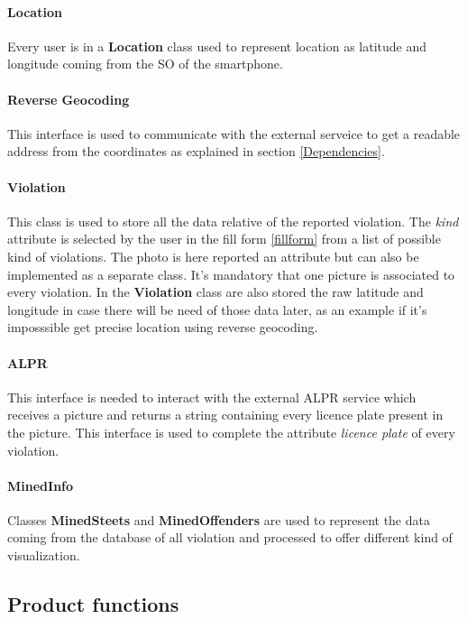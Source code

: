 \paragraph{Location}
Every user is in a \textbf{Location} class used to represent location as latitude and longitude coming from the SO of the smartphone.
\paragraph{Reverse Geocoding}
This interface is used to communicate with the external serveice to get a readable address from the coordinates as explained in section \ref{Dependencies}.
\paragraph{Violation}
This class is used to store all the data relative of the reported violation. The \textit{kind} attribute is selected by the user in the fill form \ref{fillform} from a list of possible kind of violations.
The photo is here reported an attribute but can also be implemented as a separate class. It's mandatory that one picture is associated to every violation. In the \textbf{Violation} class are also stored the raw latitude and longitude in case there will be need of those data later, as an example if it's imposssible get precise location using reverse geocoding.
\paragraph{ALPR}
This interface is needed to interact with the external ALPR service which receives a picture and returns a string containing every licence plate present in the picture. This interface is used to complete the attribute \textit{licence plate} of every violation.
\paragraph{MinedInfo}
Classes \textbf{MinedSteets} and \textbf{MinedOffenders} are used to represent the data coming from the database of all violation and processed to offer different kind of visualization.
\paragraph{}




\subsection{Product functions}

